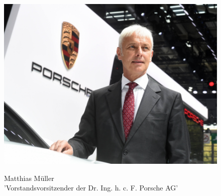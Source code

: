 \documentclass[12pt]{article}
\begin{document}
\begin{figure}[here!]
	\centering
	\begin{minipage}[h]{0.20\textwidth}
		\centering
		\includegraphics[width=1.0\textwidth]{images/MathiasMueller.jpg}
		\label{fig:vorstandvw4}
	\end{minipage}
	\begin{minipage}[h]{0.10\textwidth}
		\hspace{1cm} 
	\end{minipage}
	\begin{minipage}[h]{0.65\textwidth}
		Matthias Müller\\
		'Vorstandsvorsitzender der Dr. Ing. h. c. F. Porsche AG'
	\end{minipage}
\end{figure}
\end{document}
